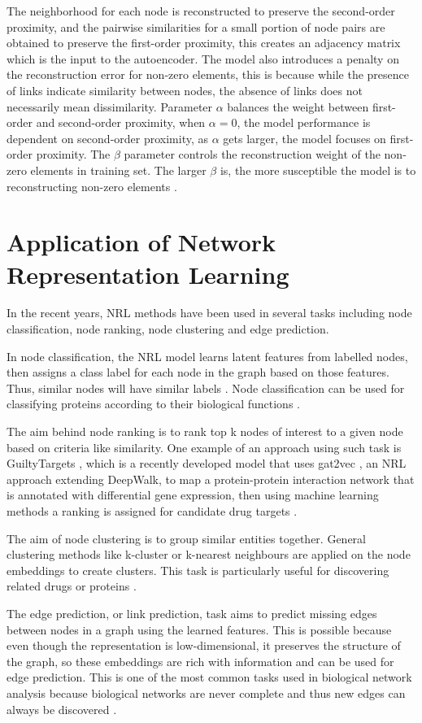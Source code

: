 The neighborhood for each node is reconstructed to preserve the second-order proximity, and the pairwise similarities for a small portion of node pairs are obtained to preserve the first-order proximity, this creates an adjacency matrix which is the input to the autoencoder. The model also introduces a penalty on the reconstruction error for non-zero elements, this is because while the presence of links indicate similarity between nodes, the absence of links does not necessarily mean dissimilarity. Parameter $\alpha$ balances the weight between first-order and second-order proximity, when $\alpha=0$, the model performance is dependent on second-order proximity, as $\alpha$ gets larger, the model focuses on first-order proximity. The $\beta$ parameter controls the reconstruction weight of the non-zero elements in training set. The larger $\beta$ is, the more susceptible the model is to reconstructing non-zero elements \cite{wang_structural_2016}.

\section{Application of Network Representation Learning}
In the recent years, \ac{NRL} methods have been used in several tasks including node classification, node ranking, node clustering and edge prediction.

In node classification, the \ac{NRL} model learns latent features from labelled nodes, then assigns a class label for each node in the graph based on those features. Thus, similar nodes will have similar labels \cite{cui_survey_2017}. Node classification can be used for classifying proteins according to their biological functions \cite{grover_node2vec:_2016}.

The aim behind node ranking is to rank top k nodes of interest to a given node based on criteria like similarity. One example of an approach using such task is GuiltyTargets \cite{muslu_guiltytargets:_2019}, which is a recently developed model that uses gat2vec \cite{sheikh_gat2vec:_2018}, an \ac{NRL} approach extending DeepWalk, to map a protein-protein interaction network that is annotated with differential gene expression, then using machine learning methods a ranking is assigned for candidate drug targets \cite{muslu_guiltytargets:_2019}.

The aim of node clustering is to group similar entities together. General clustering methods like k-cluster or k-nearest neighbours are applied on the node embeddings to create clusters. This task is particularly useful for discovering related drugs or proteins \cite{hamilton_representation_nodate}.

The edge prediction, or link prediction, task aims to predict missing edges between nodes in a graph using the learned features. This is possible because even though the representation is low-dimensional, it preserves the structure of the graph, so these embeddings are rich with information and can be used for edge prediction. This is one of the most common tasks used in biological network analysis because biological networks are never complete and thus new edges can always be discovered \cite{hamilton_representation_nodate}. 
